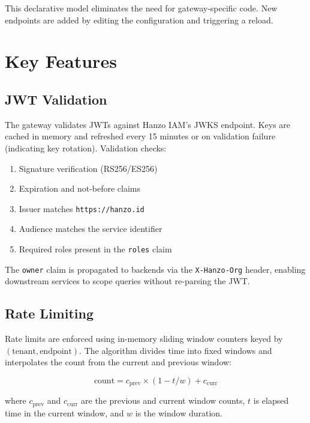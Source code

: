 \documentclass[11pt,twocolumn]{article}
\begin{document}
This declarative model eliminates the need for gateway-specific code. New endpoints are added by editing the configuration and triggering a reload.

\section{Key Features}

\subsection{JWT Validation}

The gateway validates JWTs against Hanzo IAM's JWKS endpoint. Keys are cached in memory and refreshed every 15 minutes or on validation failure (indicating key rotation). Validation checks:

\begin{enumerate}
    \item Signature verification (RS256/ES256)
    \item Expiration and not-before claims
    \item Issuer matches \texttt{https://hanzo.id}
    \item Audience matches the service identifier
    \item Required roles present in the \texttt{roles} claim
\end{enumerate}

The \texttt{owner} claim is propagated to backends via the \texttt{X-Hanzo-Org} header, enabling downstream services to scope queries without re-parsing the JWT.

\subsection{Rate Limiting}

Rate limits are enforced using in-memory sliding window counters keyed by $(\text{tenant}, \text{endpoint})$. The algorithm divides time into fixed windows and interpolates the count from the current and previous window:

\begin{equation}
    \text{count} = c_{\text{prev}} \times (1 - t/w) + c_{\text{curr}}
\end{equation}

where $c_{\text{prev}}$ and $c_{\text{curr}}$ are the previous and current window counts, $t$ is elapsed time in the current window, and $w$ is the window duration.
\end{document}
